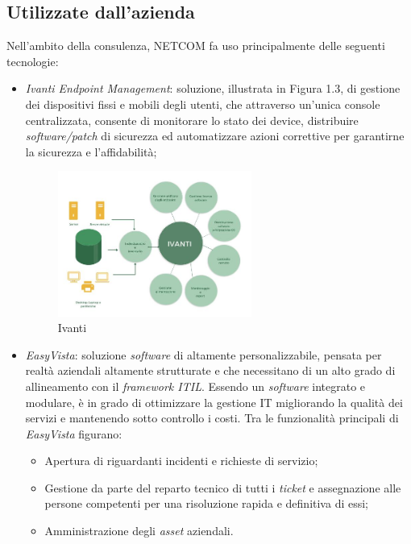 \subsection{Utilizzate dall'azienda}
Nell'ambito della consulenza, NETCOM fa uso principalmente delle seguenti tecnologie:
\begin{itemize}
    \item \emph{Ivanti Endpoint Management}: soluzione, illustrata in Figura 1.3, di gestione dei dispositivi fissi e mobili degli utenti, che attraverso un’unica console centralizzata, consente di monitorare lo stato dei device, distribuire \emph{software/patch} di sicurezza ed automatizzare azioni correttive per garantirne la sicurezza e l'affidabilità;
        \begin{figure}[!ht]
        \centering
        \captionsetup{justification=centering,margin=2cm}
            \includegraphics[width=0.6\textwidth ]{figures/Ivanti.png}
            \caption [Ivanti]{Ivanti \label{fig:Ivanti}}
    \end{figure}
    \item \emph{EasyVista}: soluzione \emph{software} di  altamente personalizzabile, pensata per realtà aziendali altamente strutturate e che necessitano di un alto grado di allineamento con il \emph{framework ITIL}. Essendo un \emph{software} integrato e modulare, è in grado di ottimizzare la gestione IT migliorando la qualità dei servizi e mantenendo sotto controllo i costi.
    Tra le funzionalità principali di \emph{EasyVista} figurano:
    \begin{itemize}
        \item Apertura di  riguardanti incidenti e richieste di servizio;
        \item Gestione da parte del reparto tecnico di tutti i \emph{ticket} e assegnazione alle persone competenti per una risoluzione rapida e definitiva di essi;
        \item Amministrazione degli \emph{asset} aziendali.

\end{itemize}
\end{itemize}
